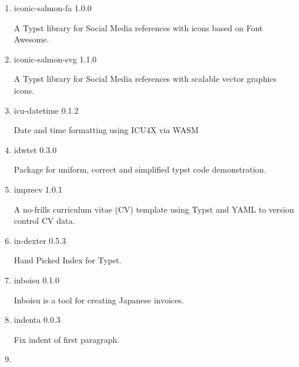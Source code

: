 \begin{enumerate}
  { icicle } { 0.1.0 }

  Help the Typst Guys reach the helicopter pad and save Christmas!
\item
  \href{/universe/package/iconic-salmon-fa/}{}

  { iconic-salmon-fa } { 1.0.0 }

  A Typst library for Social Media references with icons based on Font
  Awesome.
\item
  \href{/universe/package/iconic-salmon-svg/}{}

  { iconic-salmon-svg } { 1.1.0 }

  A Typst library for Social Media references with scalable vector
  graphics icons.
\item
  \href{/universe/package/icu-datetime/}{}

  { icu-datetime } { 0.1.2 }

  Date and time formatting using ICU4X via WASM
\item
  \href{/universe/package/idwtet/}{}

  { idwtet } { 0.3.0 }

  Package for uniform, correct and simplified typst code demonstration.
\item
  \href{/universe/package/imprecv/}{}


  { imprecv } { 1.0.1 }

  A no-frills curriculum vitae (CV) template using Typst and YAML to
  version control CV data.
\item
  \href{/universe/package/in-dexter/}{}

  { in-dexter } { 0.5.3 }

  Hand Picked Index for Typst.
\item
  \href{/universe/package/inboisu/}{}


  { inboisu } { 0.1.0 }

  Inboisu is a tool for creating Japanese invoices.
\item
  \href{/universe/package/indenta/}{}

  { indenta } { 0.0.3 }

  Fix indent of first paragraph.
\item
  \href{/universe/package/indic-numerals/}{}


\end{enumerate}
